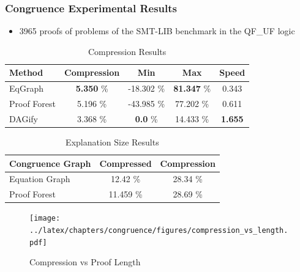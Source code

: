 \documentclass{beamer}
\begin{document}
\begin{frame}

\frametitle{Congruence Experimental Results}

\begin{itemize}
		\item 3965 proofs of problems of the SMT-LIB benchmark in the QF\_UF logic
\end{itemize}

\begin{table}[h]
\centering
\begin{tabular}{l c c c c}
\toprule
\textbf{Method} & \textbf{Compression} & \textbf{Min} & \textbf{Max} & \textbf{Speed}\\ 
\midrule

EqGraph & \textbf{5.350} \% & -18.302 \% & \textbf{81.347} \% & 0.343 \\ 
Proof Forest &  5.196 \% & -43.985 \% & 77.202 \% & 0.611 \\ 
DAGify & 3.368 \% & \textbf{0.0} \% & 14.433 \% & \textbf{1.655} \\ 

\bottomrule
\end{tabular}
\caption{Compression Results}
\label{tab:congruence_results}
\end{table}

\begin{table}[h]
\centering
\begin{tabular}{l c c}
\toprule
\textbf{Congruence Graph} & \textbf{Compressed} & \textbf{Compression} \\ 
\midrule

Equation Graph & 12.42 \% & 28.34 \% \\ 
Proof Forest & 11.459 \% & 28.69 \% \\ 

\bottomrule
\end{tabular}
\caption{Explanation Size Results}
\label{tab:explanation_results}
\end{table}

\end{frame}

\begin{frame}
\begin{figure}[h]
	\centering
	\texttt{[image: ../latex/chapters/congruence/figures/compression\_vs\_length.pdf]}
	\caption{Compression vs Proof Length}
	\label{fig:congruence_compression}
\end{figure}

\end{frame}
\end{document}
